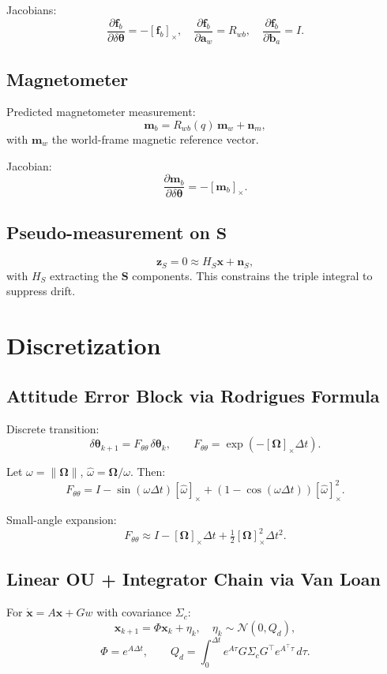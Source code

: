\documentclass[11pt]{article}
\begin{document}
Jacobians:
\[
\frac{\partial \bm f_b}{\partial \delta\bm\theta} = -[\bm f_b]_\times, \quad
\frac{\partial \bm f_b}{\partial \bm a_w} = R_{wb}, \quad
\frac{\partial \bm f_b}{\partial \bm b_a} = I.
\]

\subsection{Magnetometer}
Predicted magnetometer measurement:
\[
\bm m_b = R_{wb}(q)\,\bm m_w + \bm n_m,
\]
with $\bm m_w$ the world-frame magnetic reference vector.

Jacobian:
\[
\frac{\partial \bm m_b}{\partial \delta\bm\theta} = -[\bm m_b]_\times.
\]

\subsection{Pseudo-measurement on $\bm S$}
\[
\bm z_S = 0 \approx H_S \bm x + \bm n_S,
\]
with $H_S$ extracting the $\bm S$ components.  
This constrains the triple integral to suppress drift.

\section{Discretization}
\subsection{Attitude Error Block via Rodrigues Formula}
Discrete transition:
\[
\delta\bm\theta_{k+1} = F_{\theta\theta}\,\delta\bm\theta_k,
\qquad
F_{\theta\theta} = \exp(-[\bm\Omega]_\times \Delta t).
\]

Let $\omega=\|\bm\Omega\|$, $\hat\omega=\bm\Omega/\omega$. Then:
\[
F_{\theta\theta} =
I - \sin(\omega\Delta t)[\hat\omega]_\times 
+ (1-\cos(\omega\Delta t))[\hat\omega]_\times^2.
\]

Small-angle expansion:
\[
F_{\theta\theta} \approx I - [\bm\Omega]_\times \Delta t + \tfrac{1}{2}[\bm\Omega]_\times^2 \Delta t^2.
\]

\subsection{Linear OU + Integrator Chain via Van Loan}
For $\dot{\bm x}=A\bm x + G w$ with covariance $\Sigma_c$:
\[
\bm x_{k+1} = \Phi \bm x_k + \eta_k, \quad 
\eta_k\sim \mathcal{N}(0,Q_d),
\]
\[
\Phi = e^{A\Delta t}, \qquad
Q_d = \int_0^{\Delta t} e^{A\tau} G \Sigma_c G^\top e^{A^\top\tau}\,d\tau.
\]
\end{document}
